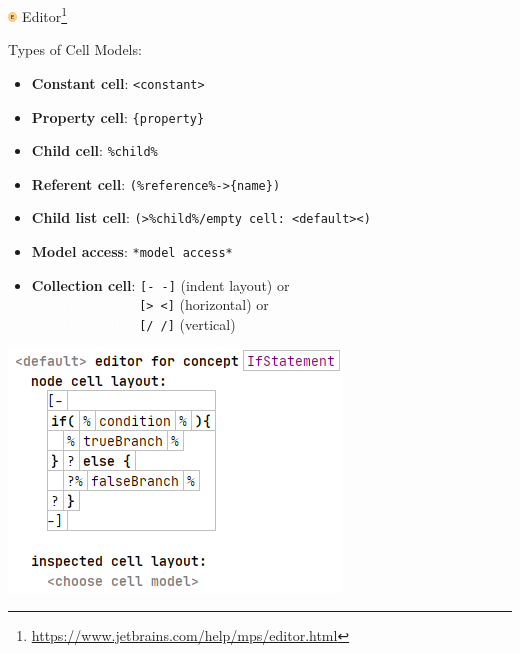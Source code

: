	\begin{frame}{\includegraphics[height=0.25cm]{graphics/editor.png}  Editor\footnote{\url{https://www.jetbrains.com/help/mps/editor.html}}}
		\begin{minipage}{0.52\textwidth}
			Types of Cell Models:
			\begin{itemize}
				\item \textbf{Constant cell}: \texttt{<constant>}
				\item \textbf{Property cell}: \texttt{\{property\}}
				\item \textbf{Child cell}: \texttt{\%child\%}
				\item \textbf{Referent cell}: \texttt{(\%reference\%->\{name\})}
				\item \textbf{Child list cell}: \texttt{(>\%child\%/empty cell: <default><)}
				\item \textbf{Model access}: \texttt{*model access*}
				\item \textbf{Collection cell}: \texttt{[- -]} (indent layout) or \\
				\textcolor{white}{Collection cell: n} \texttt{[> <]} (horizontal) or \\
				\textcolor{white}{Collection cell: n} \texttt{[/ /]} (vertical) 
			\end{itemize}
		\end{minipage}
		\begin{minipage}{0.4\textwidth}
			\includegraphics[height=0.8\textheight]{illustrations/editor.png}
		\end{minipage}
	\end{frame}

